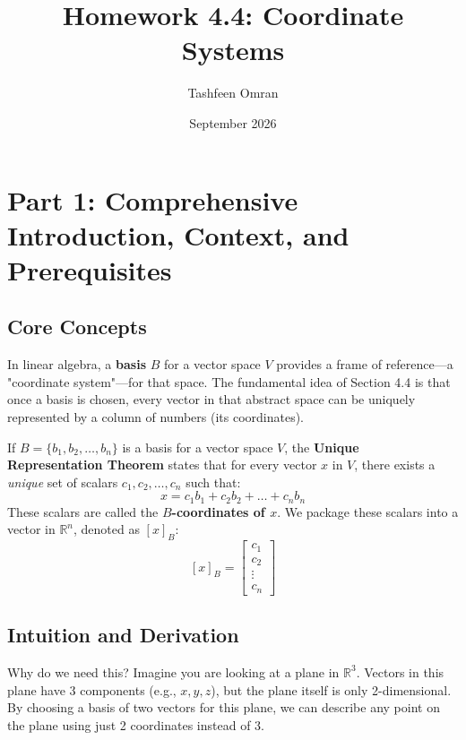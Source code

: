 \documentclass[11pt]{article}
\title{\textbf{Homework 4.4: Coordinate Systems}}
\author{Tashfeen Omran}
\date{September 2026}
\begin{document}
\maketitle
\tableofcontents
\newpage

\section{Part 1: Comprehensive Introduction, Context, and Prerequisites}

\subsection{Core Concepts}
In linear algebra, a \textbf{basis} $B$ for a vector space $V$ provides a frame of reference—a "coordinate system"—for that space. The fundamental idea of Section 4.4 is that once a basis is chosen, every vector in that abstract space can be uniquely represented by a column of numbers (its coordinates). 

If $B = \{b_1, b_2, \dots, b_n\}$ is a basis for a vector space $V$, the \textbf{Unique Representation Theorem} states that for every vector $x$ in $V$, there exists a \textit{unique} set of scalars $c_1, c_2, \dots, c_n$ such that:
\[ x = c_1 b_1 + c_2 b_2 + \dots + c_n b_n \]
These scalars are called the \textbf{$B$-coordinates of $x$}. We package these scalars into a vector in $\mathbb{R}^n$, denoted as $[x]_B$:
\[ [x]_B = \begin{bmatrix} c_1 \\ c_2 \\ \vdots \\ c_n \end{bmatrix} \]

\subsection{Intuition and Derivation}
Why do we need this? Imagine you are looking at a plane in $\mathbb{R}^3$. Vectors in this plane have 3 components (e.g., $x, y, z$), but the plane itself is only 2-dimensional. By choosing a basis of two vectors for this plane, we can describe any point on the plane using just 2 coordinates instead of 3. 
\end{document}
